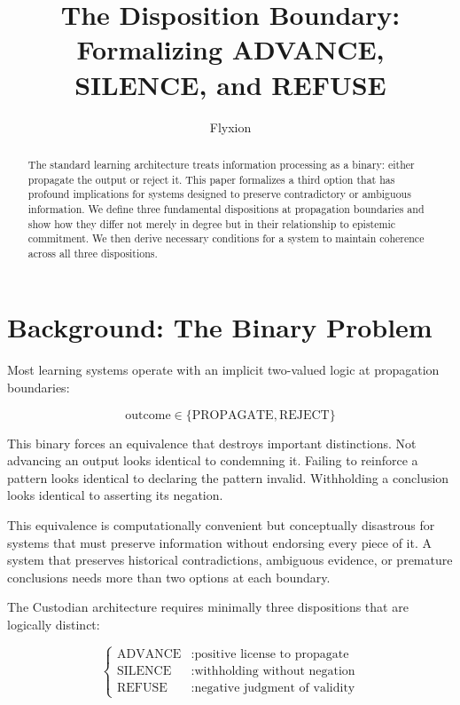 \documentclass[12pt]{article}
\title{The Disposition Boundary: Formalizing ADVANCE, SILENCE, and REFUSE}
\author{Flyxion}
\date{}
\begin{document}
\maketitle

\begin{abstract}

The standard learning architecture treats information processing as a binary: either propagate the output or reject it. This paper formalizes a third option that has profound implications for systems designed to preserve contradictory or ambiguous information. We define three fundamental dispositions at propagation boundaries and show how they differ not merely in degree but in their relationship to epistemic commitment. We then derive necessary conditions for a system to maintain coherence across all three dispositions.

\end{abstract}

\section{Background: The Binary Problem}

Most learning systems operate with an implicit two-valued logic at propagation boundaries:

\begin{equation}
\text{outcome} \in \{\text{PROPAGATE}, \text{REJECT}\}
\end{equation}

This binary forces an equivalence that destroys important distinctions. Not advancing an output looks identical to condemning it. Failing to reinforce a pattern looks identical to declaring the pattern invalid. Withholding a conclusion looks identical to asserting its negation.

This equivalence is computationally convenient but conceptually disastrous for systems that must preserve information without endorsing every piece of it. A system that preserves historical contradictions, ambiguous evidence, or premature conclusions needs more than two options at each boundary.

The Custodian architecture requires minimally three dispositions that are logically distinct:

\begin{equation}
\boxed{
\begin{cases}
\text{ADVANCE} & : \text{positive license to propagate}\\
\text{SILENCE} & : \text{withholding without negation}\\
\text{REFUSE} & : \text{negative judgment of validity}
\end{cases}
}
\end{equation}
\end{document}
